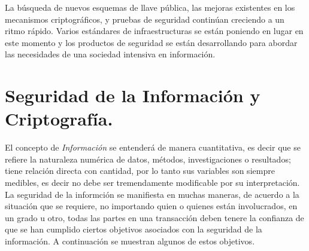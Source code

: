 \documentclass[12pt]{article}
\begin{document}
La búsqueda de nuevos esquemas de llave pública, las mejoras existentes en los mecanismos criptográficos, y pruebas de seguridad continúan creciendo a un ritmo rápido. Varios estándares de infraestructuras se están poniendo en lugar en este momento y los productos de seguridad se están desarrollando para abordar las necesidades de una sociedad intensiva en información. \\ 

\section{Seguridad de la Información y Criptografía.}

El concepto de \textit{Información} se entenderá de manera cuantitativa, es decir que se refiere la naturaleza numérica de datos, métodos, investigaciones o resultados; tiene relación directa con cantidad, por lo tanto sus variables son siempre medibles, es decir no debe ser tremendamente  modificable por su interpretación.\\ 

La seguridad de la informción se manifiesta en muchas maneras, de acuerdo a la situación que se requiere, no importando quien o quienes están involucrados, en un grado u otro, todas las partes en una transacción deben tenere la confianza de que se han cumplido ciertos objetivos asociados con la seguridad de la información. A continuación se muestran algunos de estos objetivos.\\
	
\end{document}
